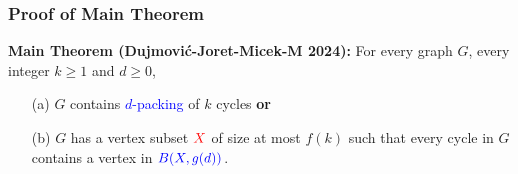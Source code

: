 \documentclass{beamer}
\begin{document}
\begin{frame}
  \frametitle{Proof of Main Theorem}

  \noindent\textbf{Main Theorem (Dujmović-Joret-Micek-M 2024):} For every graph $G$, every integer $k\ge 1$ and $d\ge 0$,
  \begin{enumerate}%
    \item[(a)] $G$ contains \textcolor{blue}{$d$-packing} of $k$ cycles \textbf{or}
    \item[(b)] $G$ has a vertex subset $\mathcolor{red}{X}$ of size at most $f(k)$ such that every cycle in $G$ contains a vertex in $\mathcolor{blue}{B(X, g(d))}$.
  \end{enumerate}
  \begin{minipage}[t][.5\textheight]{\textwidth}
\end{minipage}
\end{frame}
\end{document}
